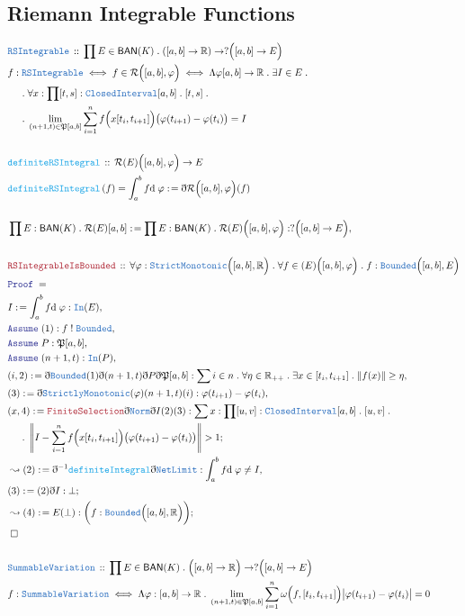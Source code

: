 \documentclass[12pt]{scrartcl}
\newcommand{\TYPE}[1]{\textcolor{NavyBlue}{\mathtt{#1}}}
\newcommand{\FUNC}[1]{\textcolor{Cerulean}{\mathtt{#1}}}
\newcommand{\LOGIC}[1]{\textcolor{Blue}{\mathtt{#1}}}
\newcommand{\THM}[1]{\textcolor{Maroon}{\mathtt{#1}}}
\renewcommand{\.}{\; . \;}
\newcommand{\de}{: \kern 0.1pc =}
\newcommand{\IsNot}{\; ! \;}
\newcommand{\Act}[1]{\left( #1 \right)}
\newcommand{\Theorem}[2]{& \THM{#1} \, :: \, #2 \\ & \Proof = \\ }
\newcommand{\DeclareType}[2]{& \TYPE{#1} \, :: \, #2 \\}
\newcommand{\DefineType}[3]{& #1 : \TYPE{#2} \iff #3 \\}
\newcommand{\DefineNamedType}[4]{& #1 : \TYPE{#2} \iff #3 \iff #4 \\}
\newcommand{\DeclareFunc}[2]{& \FUNC{#1} \, :: \, #2 \\}
\newcommand{\DefineNamedFunc}[4]{&  \FUNC{#1}\Act{#2} = #3 \de #4 \\}
\newcommand{\NewLine}{\\ & \kern 1pc}
\newcommand{\Page}[1]{ \begin{align*} #1 \end{align*}   }
\newcommand{ \bd }{ \ByDef }
\newcommand{\Reals}{\mathbb{R} }
\newcommand{\Say}[3]{& #1 \de #2 : #3, \\}
\newcommand{\Conclude}[3]{& #1 \de #2 : #3; \\}
\newcommand{\Derive}[3]{& \leadsto #1 \de #2 : #3, \\}
\newcommand{\DeriveConclude}[3]{& \leadsto #1 \de #2 : #3 ; \\}
\newcommand{\Assume}[2]{& \LOGIC{Assume} \;#1 : #2, \\}
\newcommand{\QED}{\; \square}
\newcommand{\EndProof}{& \QED \\}
\newcommand{\ByDef}{\eth}
\newcommand{\Proof}{\LOGIC{Proof} \; }
\begin{document}
\subsection{Riemann Integrable Functions}
\Page{
	\DeclareType{RSIntegrable}{ \prod E \in \mathsf{BAN}(K) \. ([a,b]\to \Reals) \to ?\Big( [a,b] \to E   \Big) }
		\DefineNamedType{f}{RSIntegrable}{ f \in \mathcal{R}\Big([a,b],\varphi\Big)  }
	{ \Lambda \varphi [a,b] \to \Reals \. 
		\exists I \in E \. \NewLine \. \forall x : \prod [t,s] : \TYPE{ClosedInterval}[a,b] \. [t,s] \. 
		\NewLine \.
		\lim_{(n + 1,t) \in \mathfrak{P}[a,b]} \sum^n_{i=1} f\Big(x[t_i,t_{i + 1}]\Big)
		\big(\varphi(t_{i+1}) -\varphi(t_i)\big) = I } 
	\\
	\DeclareFunc{definiteRSIntegral}{ \mathcal{R}(E)\Big([a,b],\varphi\Big) \to E}
	\DefineNamedFunc{definiteRSIntegral}{f}{\int^b_a f \mathrm{d}\; \varphi}{\bd \mathcal{R}\Big([a,b],\varphi\Big)(f)}
	\\
	\Say{\prod E : \mathsf{BAN}(K) \. \mathcal{R}(E)[a,b]}{
		\prod E : \mathsf{BAN}(K) \. \mathcal{R}(E)\Big([a,b],\varphi\Big) }
	{     ?\Big( [a,b] \to E \Big)     }
	\\
	\Theorem{RSIntegrableIsBounded}{\forall \varphi : \TYPE{StrictMonotonic}\Big([a,b],\Reals\Big) \. \forall f \in 
	\mathcal(E)\Big([a,b],\varphi\Big) \. f :  \TYPE{Bounded}\Big([a,b],E\Big)}
	\Say{I}{\int^b_a f \mathrm{d}\; \varphi}{ \TYPE{In}( E)}
	\Assume{(1)}{f \IsNot \TYPE{Bounded}}
	\Assume{P}{\mathfrak{P}[a,b]}
	\Assume{(n+1,t)}{\TYPE{In}(P)}
	\Say{(i,2)}{ \bd \TYPE{Bounded}(1)\bd (n + 1,t) \bd P \bd \mathfrak{P}[a,b]}
	{ \sum i \in n \. \forall \eta \in \Reals_{++} \. \exists x \in [t_i,t_{i+1}] 
	    \.   \| f(x) \| \ge \eta	}
	\Say{(3)}{\bd \TYPE{StrictlyMonotonic}(\varphi)(n+1,t)(i)}{ \varphi(t_{i+1}) - \varphi(t_i) }
	\Conclude{(x,4)}{ \THM{FiniteSelection}\bd \TYPE{Norm} \bd I (2)(3)   }    
	{ \sum x : \prod [u,v] : \TYPE{ClosedInterval}[a,b] \. [u,v] \. 
		\NewLine \.
	\left\|I - \sum^{n}_{i=1} f\Big(x[t_{i},t_{i+1}]\Big)   
	\big( \varphi(t_{i+1}) - \varphi(t_i) \big)	\right\| > 1 }
	\Derive{(2)}{\bd^{-1}\FUNC{definiteIntegral}\bd \TYPE{NetLimit}}{ \int^b_a f \mathrm{d} \; \varphi \neq I }
	\Conclude{(3)}{(2)\bd I}{\bot}
	\DeriveConclude{(4)}{E(\bot)}{\bigg( f : \TYPE{Bounded}\Big( [a,b],\Reals \Big) \bigg)}
	\EndProof
	\\
	\DeclareType{SummableVariation}{\prod E \in \mathsf{BAN}(K) \. \Big([a,b] \to \Reals\Big) \to 
		?\Big([a,b] \to E \Big)}
	\DefineType{f}{SummableVariation}
	{ \Lambda \varphi : [a,b] \to \Reals \. \lim_{(n+1,t) \in \mathfrak{P}[a,b]} 
		\sum^n_{i=1} \omega\Big(f, [t_i,t_{i+1}] \Big)\big| \varphi(t_{i+1}) - \varphi(t_i)  \big| = 0 }
}
\end{document}
